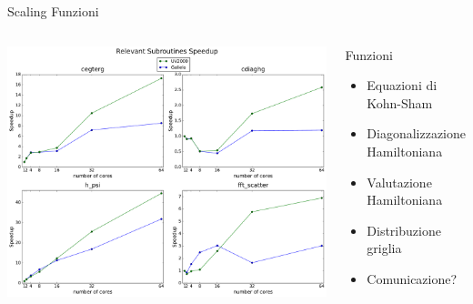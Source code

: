 \documentclass[8pt]{beamer}
\begin{document}
\appendix

\begin{frame}{Scaling Funzioni} %
\begin{columns}
		\begin{center}			
			\vspace{-1cm}
			\includegraphics[width=1.1\textwidth]{beam_arch_subroutines.pdf}			
		\end{center}
		\begin{overlayarea}{\linewidth}{\textheight}
		\begin{block}{Funzioni}
			\begin{itemize}
				\item Equazioni di Kohn-Sham
				\item Diagonalizzazione Hamiltoniana
				\item Valutazione Hamiltoniana
				\item Distribuzione griglia
				\item Comunicazione?
			\end{itemize}		
		\end{block}

		\end{overlayarea}
\end{columns}

\end{frame}
\end{document}
